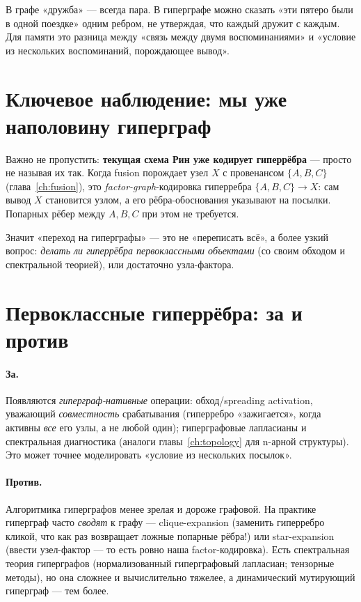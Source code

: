 \begin{intuition}
В графе «дружба» — всегда пара. В гиперграфе можно сказать «эти пятеро были в одной
поездке» одним ребром, не утверждая, что каждый дружит с каждым. Для памяти это
разница между «связь между двумя воспоминаниями» и «условие из нескольких
воспоминаний, порождающее вывод».
\end{intuition}

\section{Ключевое наблюдение: мы уже наполовину гиперграф}

Важно не пропустить: \textbf{текущая схема Рин уже кодирует гиперрёбра} — просто не
называя их так. Когда fusion порождает узел $X$ с провенансом $\{A,B,C\}$
(глава~\ref{ch:fusion}), это \emph{factor-graph}-кодировка гиперребра
$\{A,B,C\}\to X$: сам вывод $X$ становится узлом, а его рёбра-обоснования указывают
на посылки. Попарных рёбер между $A,B,C$ при этом не требуется.

Значит «переход на гиперграфы» — это не «переписать всё», а более узкий вопрос:
\emph{делать ли гиперрёбра первоклассными объектами} (со своим обходом и спектральной
теорией), или достаточно узла-фактора.

\section{Первоклассные гиперрёбра: за и против}

\paragraph{За.} Появляются \emph{гиперграф-нативные} операции: обход/spreading
activation, уважающий \emph{совместность} срабатывания (гиперребро «зажигается»,
когда активны \emph{все} его узлы, а не любой один); гиперграфовые лапласианы и
спектральная диагностика (аналоги главы~\ref{ch:topology} для n-арной структуры). Это
может точнее моделировать «условие из нескольких посылок».

\paragraph{Против.} Алгоритмика гиперграфов менее зрелая и дороже графовой. На
практике гиперграф часто \emph{сводят} к графу — clique-expansion (заменить
гиперребро кликой, что как раз возвращает ложные попарные рёбра!) или
star-expansion (ввести узел-фактор — то есть ровно наша factor-кодировка). Есть
спектральная теория гиперграфов (нормализованный гиперграфовый лапласиан; тензорные
методы), но она сложнее и вычислительно тяжелее, а динамический мутирующий гиперграф
— тем более.

